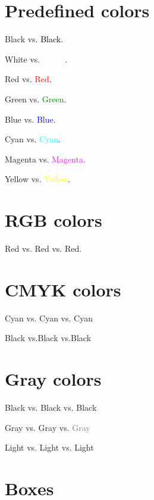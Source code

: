 \documentclass{article}
\begin{document}
\section{Predefined colors}
{\color{black} Black} vs. \textcolor{black}{Black}.

{\color{white} White} vs. \textcolor{white}{White}.

{\color{red} Red} vs. \textcolor{red}{Red}.

{\color{green} Green} vs. \textcolor{green}{Green}.

{\color{blue} Blue} vs. \textcolor{blue}{Blue}.

{\color{cyan} Cyan} vs. \textcolor{cyan}{Cyan}.

{\color{magenta} Magenta} vs. \textcolor{magenta}{Magenta}.

{\color{yellow} Yellow} vs. \textcolor{yellow}{Yellow}.



\section{RGB colors}
{\color[rgb]{1.0,0.0,0.0} Red}
vs. \textcolor[rgb]{1.0,0.0,0.0}{Red}
vs. \textcolor{rgbred}{Red}.

\section{CMYK colors}
{\color[cmyk]{1.0,0.0,0.0,0.0} Cyan}
vs. \textcolor[cmyk]{1.0,0.0,0.0,0.0}{Cyan}
vs. \textcolor{cmykcyan}{Cyan}

{\color[cmyk]{0.0,0.0,0.0,1.0} Black}
vs.\textcolor[cmyk]{0.0,0.0,0.0,1.0}{Black}
vs.\textcolor{cmykblack}{Black}

\section{Gray colors}
{\color[gray]{0.0} Black}
vs. \textcolor[gray]{0.0}{Black}
vs. \textcolor{grayblack}{Black}

{\color[gray]{0.5} Gray}
vs. \textcolor[gray]{0.5}{Gray}
vs. \textcolor{gray}{Gray}

{\color[gray]{0.9} Light}
vs. \textcolor[gray]{0.9}{Light}
vs. \textcolor{light}{Light}


\section{Boxes}
\end{document}
